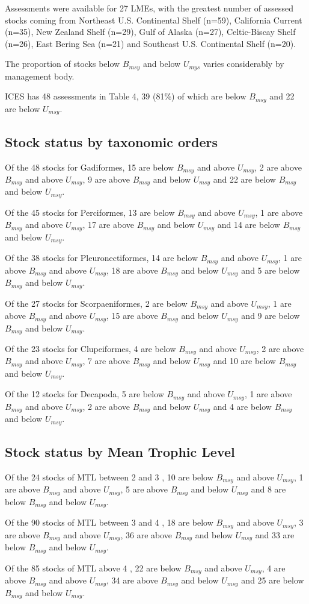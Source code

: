 Assessments were available for 27 LMEs, with the greatest number of
assessed stocks coming from Northeast U.S. Continental Shelf (n=59),
California Current (n=35), New Zealand Shelf (n=29),
Gulf of Alaska (n=27), Celtic-Biscay Shelf (n=26), East Bering Sea (n=21)
and Southeast U.S. Continental Shelf (n=20).

The proportion of stocks below $B_{msy}$ and below $U_{mys}$ varies considerably by management body. 

ICES has 48 assessments in Table 4,
39
(81\%) of which are below
$B_{msy}$ and 22 are below
$U_{msy}$.

\subsection*{Stock status by taxonomic orders}

Of the 48 stocks for Gadiformes, 15 are below $B_{msy}$ and above $U_{msy}$, 2 are above $B_{msy}$ and above $U_{msy}$, 9 are above $B_{msy}$ and below $U_{msy}$ and 22 are below $B_{msy}$ and below $U_{msy}$.

Of the 45 stocks for Perciformes, 13 are below $B_{msy}$ and above $U_{msy}$, 1 are above $B_{msy}$ and above $U_{msy}$, 17 are above $B_{msy}$ and below $U_{msy}$ and 14 are below $B_{msy}$ and below $U_{msy}$.

Of the 38 stocks for Pleuronectiformes, 14 are below $B_{msy}$ and above $U_{msy}$, 1 are above $B_{msy}$ and above $U_{msy}$, 18 are above $B_{msy}$ and below $U_{msy}$ and 5 are below $B_{msy}$ and below $U_{msy}$.

Of the 27 stocks for Scorpaeniformes, 2 are below $B_{msy}$ and above $U_{msy}$, 1 are above $B_{msy}$ and above $U_{msy}$, 15 are above $B_{msy}$ and below $U_{msy}$ and 9 are below $B_{msy}$ and below $U_{msy}$.

Of the 23 stocks for Clupeiformes, 4 are below $B_{msy}$ and above $U_{msy}$, 2 are above $B_{msy}$ and above $U_{msy}$, 7 are above $B_{msy}$ and below $U_{msy}$ and 10 are below $B_{msy}$ and below $U_{msy}$.

Of the 12 stocks for Decapoda, 5 are below $B_{msy}$ and above $U_{msy}$, 1 are above $B_{msy}$ and above $U_{msy}$, 2 are above $B_{msy}$ and below $U_{msy}$ and 4 are below $B_{msy}$ and below $U_{msy}$.


\subsection*{Stock status by Mean Trophic Level}
Of the 24 stocks of MTL between 2 and 3 , 10 are below $B_{msy}$ and above $U_{msy}$, 1 are above $B_{msy}$ and above $U_{msy}$, 5 are above $B_{msy}$ and below $U_{msy}$ and 8 are below $B_{msy}$ and below $U_{msy}$.

Of the 90 stocks of MTL between 3 and 4 , 18 are below $B_{msy}$ and above $U_{msy}$, 3 are above $B_{msy}$ and above $U_{msy}$, 36 are above $B_{msy}$ and below $U_{msy}$ and 33 are below $B_{msy}$ and below $U_{msy}$.

Of the 85 stocks of MTL above 4 , 22 are below $B_{msy}$ and above $U_{msy}$, 4 are above $B_{msy}$ and above $U_{msy}$, 34 are above $B_{msy}$ and below $U_{msy}$ and 25 are below $B_{msy}$ and below $U_{msy}$.
